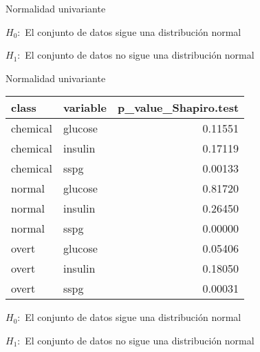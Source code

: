 \documentclass[ignorenonframetext,]{beamer}
\newenvironment{Shaded}{\begin{snugshade}}{\end{snugshade}}
\newcommand{\KeywordTok}[1]{\textcolor[rgb]{0.13,0.29,0.53}{\textbf{#1}}}
\newcommand{\DataTypeTok}[1]{\textcolor[rgb]{0.13,0.29,0.53}{#1}}
\newcommand{\DecValTok}[1]{\textcolor[rgb]{0.00,0.00,0.81}{#1}}
\newcommand{\StringTok}[1]{\textcolor[rgb]{0.31,0.60,0.02}{#1}}
\newcommand{\CommentTok}[1]{\textcolor[rgb]{0.56,0.35,0.01}{\textit{#1}}}
\newcommand{\OperatorTok}[1]{\textcolor[rgb]{0.81,0.36,0.00}{\textbf{#1}}}
\newcommand{\NormalTok}[1]{#1}
\begin{document}
\begin{frame}[fragile]{Normalidad univariante}

\(H_0:\) El conjunto de datos sigue una distribución normal

\(H_1:\) El conjunto de datos no sigue una distribución normal

\begin{Shaded}
\end{Shaded}

\end{frame}

\begin{frame}{Normalidad univariante}

\begin{tabular}{l|l|r}
\hline
class & variable & p\_value\_Shapiro.test\\
\hline
chemical & glucose & 0.11551\\
\hline
chemical & insulin & 0.17119\\
\hline
chemical & sspg & 0.00133\\
\hline
normal & glucose & 0.81720\\
\hline
normal & insulin & 0.26450\\
\hline
normal & sspg & 0.00000\\
\hline
overt & glucose & 0.05406\\
\hline
overt & insulin & 0.18050\\
\hline
overt & sspg & 0.00031\\
\hline
\end{tabular}

\(H_0:\) El conjunto de datos sigue una distribución normal

\(H_1:\) El conjunto de datos no sigue una distribución normal

\end{frame}
\end{document}
